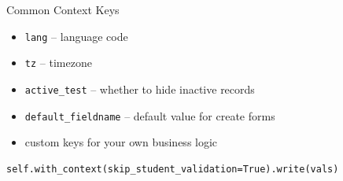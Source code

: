 \begin{frame}[fragile]{Common Context Keys}
	\begin{itemize}
		\item \texttt{lang} -- language code
		\item \texttt{tz} -- timezone
		\item \texttt{active\_test} -- whether to hide inactive records
		\item \texttt{default\_fieldname} -- default value for create forms
		\item custom keys for your own business logic
	\end{itemize}
\begin{lstlisting}
self.with_context(skip_student_validation=True).write(vals)
\end{lstlisting}
\end{frame}
